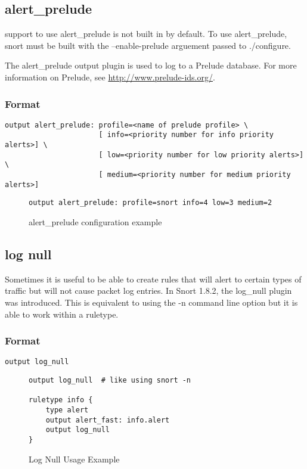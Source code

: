 \documentclass[english]{report}
\newenvironment{note}{
\samepage
    \vspace{10pt}{\textsf{
        {\hspace{7pt}\Huge{$\triangle$\hspace{-12.5pt}{\Large{$^!$}}}}\hspace{5pt}
        {\Large{NOTE}}
    }
    }
   \begin{center}
    \par\vspace{-17pt}

    \begin{lrbox}{\savepar}
    \begin{minipage}[r]{6in}
}
{
    \end{minipage}
    \end{lrbox}
    \fbox{
        \usebox{
            \savepar
	}
    }
    \par\vskip10pt
    \end{center}
}
\newenvironment{note}{
        \begin{rawhtml}
        <p><table border="1"><tr><td><b>
        Note:&nbsp;&nbsp;</b>
        \end{rawhtml}
}{
        \begin{rawhtml}
        </b></td></tr></table></p>
        \end{rawhtml}
}
\begin{document}
\subsection{alert\_prelude}

\begin{note}
support to use alert\_prelude is not built in by default.  To use alert\_prelude, snort must be built with the --enable-prelude arguement passed to ./configure.
\end{note}

The alert\_prelude output plugin is used to log to a Prelude database.  For more information on Prelude, see \url{http://www.prelude-ids.org/}.

\subsubsection{Format}

\begin{verbatim}
output alert_prelude: profile=<name of prelude profile> \
                      [ info=<priority number for info priority alerts>] \
                      [ low=<priority number for low priority alerts>] \
                      [ medium=<priority number for medium priority alerts>]
\end{verbatim}

\begin{figure}[!hbpt]
\begin{verbatim}
output alert_prelude: profile=snort info=4 low=3 medium=2
\end{verbatim}
\caption{alert\_prelude configuration example\label{prelude example}}
\end{figure}

\subsection{log null}

Sometimes it is useful to be able to create rules that will alert
to certain types of traffic but will not cause packet log entries.
In Snort 1.8.2, the log\_null plugin was introduced. This is equivalent
to using the -n command line option but it is able to work within
a ruletype.


\subsubsection{Format}

\begin{verbatim}
output log_null
\end{verbatim}
%
\begin{figure}[!hbpt]
\begin{verbatim}
output log_null  # like using snort -n

ruletype info {
    type alert
    output alert_fast: info.alert
    output log_null
}
\end{verbatim}
\caption{Log Null Usage Example\label{log null usage example}}
\end{figure}
\end{document}
